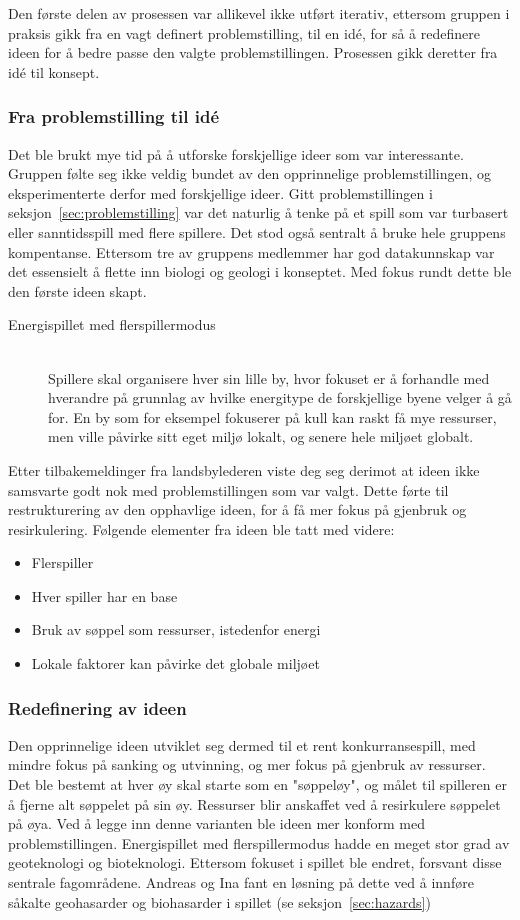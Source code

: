 Den første delen av prosessen var allikevel ikke utført iterativ, ettersom gruppen i praksis gikk fra en vagt definert problemstilling, til en idé, for så å redefinere ideen for å bedre passe den valgte problemstillingen. Prosessen gikk deretter fra idé til konsept.
\subsubsection{Fra problemstilling til idé}
Det ble brukt mye tid på å utforske forskjellige ideer som var
interessante. Gruppen følte seg ikke veldig bundet av den opprinnelige
problemstillingen, og eksperimenterte derfor med forskjellige ideer.
Gitt problemstillingen i seksjon~\ref{sec:problemstilling} var det
naturlig å tenke på et spill som var turbasert eller sanntidsspill med
flere spillere. Det stod også sentralt å bruke hele gruppens kompentanse. Ettersom tre av gruppens medlemmer har god datakunnskap var det essensielt å flette inn biologi og geologi i konseptet. Med fokus rundt dette ble den første ideen skapt.
\begin{description}
\item[Energispillet med flerspillermodus] \hfill\\
Spillere skal organisere hver sin lille by, hvor fokuset er å forhandle
med hverandre på grunnlag av hvilke energitype de forskjellige byene
velger å gå for. En by som for eksempel fokuserer på kull kan raskt få
mye ressurser, men ville påvirke sitt eget miljø lokalt, og senere hele
miljøet globalt.
\end{description}
Etter tilbakemeldinger fra landsbylederen viste deg seg derimot at ideen
ikke samsvarte godt nok med problemstillingen som var valgt. Dette førte
til restrukturering av den opphavlige ideen, for å få mer fokus på
gjenbruk og resirkulering. Følgende elementer fra ideen ble tatt med
videre:
\begin{itemize}
	\item Flerspiller
	\item Hver spiller har en base
	\item Bruk av søppel som ressurser, istedenfor energi
	\item Lokale faktorer kan påvirke det globale miljøet
\end{itemize}
\subsubsection{Redefinering av ideen}
Den opprinnelige ideen utviklet seg dermed til et rent konkurransespill,
med mindre fokus på sanking og utvinning, og mer fokus på gjenbruk av ressurser. 
Det ble bestemt at hver øy skal starte som en "søppeløy", og målet til
spilleren er å fjerne alt søppelet på sin øy.  Ressurser blir anskaffet
ved å resirkulere søppelet på øya. Ved å legge inn denne varianten ble
ideen mer konform med problemstillingen. Energispillet med
flerspillermodus hadde en meget stor grad av geoteknologi og
bioteknologi. Ettersom fokuset i spillet ble endret,
forsvant disse sentrale fagområdene. Andreas og Ina fant en løsning
på dette ved å innføre såkalte geohasarder og biohasarder i spillet (se
seksjon~\ref{sec:hazards})



